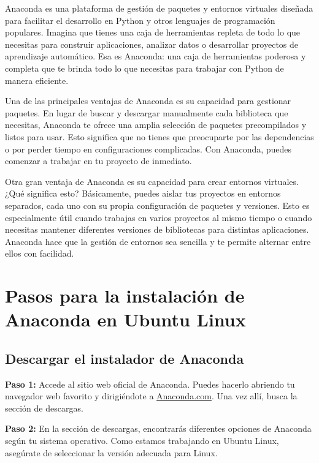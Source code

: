 \documentclass[
  letterpaper,
  DIV=11,
  numbers=noendperiod]{scrartcl}
\begin{document}
Anaconda es una plataforma de gestión de paquetes y entornos virtuales
diseñada para facilitar el desarrollo en Python y otros lenguajes de
programación populares. Imagina que tienes una caja de herramientas
repleta de todo lo que necesitas para construir aplicaciones, analizar
datos o desarrollar proyectos de aprendizaje automático. Esa es
Anaconda: una caja de herramientas poderosa y completa que te brinda
todo lo que necesitas para trabajar con Python de manera eficiente.

Una de las principales ventajas de Anaconda es su capacidad para
gestionar paquetes. En lugar de buscar y descargar manualmente cada
biblioteca que necesitas, Anaconda te ofrece una amplia selección de
paquetes precompilados y listos para usar. Esto significa que no tienes
que preocuparte por las dependencias o por perder tiempo en
configuraciones complicadas. Con Anaconda, puedes comenzar a trabajar en
tu proyecto de inmediato.

Otra gran ventaja de Anaconda es su capacidad para crear entornos
virtuales. ¿Qué significa esto? Básicamente, puedes aislar tus proyectos
en entornos separados, cada uno con su propia configuración de paquetes
y versiones. Esto es especialmente útil cuando trabajas en varios
proyectos al mismo tiempo o cuando necesitas mantener diferentes
versiones de bibliotecas para distintas aplicaciones. Anaconda hace que
la gestión de entornos sea sencilla y te permite alternar entre ellos
con facilidad.

\hypertarget{pasos-para-la-instalaciuxf3n-de-anaconda-en-ubuntu-linux}{%
\section{Pasos para la instalación de Anaconda en Ubuntu
Linux}\label{pasos-para-la-instalaciuxf3n-de-anaconda-en-ubuntu-linux}}

\hypertarget{descargar-el-instalador-de-anaconda}{%
\subsection{Descargar el instalador de
Anaconda}\label{descargar-el-instalador-de-anaconda}}

\textbf{Paso 1:} Accede al sitio web oficial de Anaconda. Puedes hacerlo
abriendo tu navegador web favorito y dirigiéndote a
\href{https://www.anaconda.com/}{Anaconda.com}. Una vez allí, busca la
sección de descargas.

\textbf{Paso 2:} En la sección de descargas, encontrarás diferentes
opciones de Anaconda según tu sistema operativo. Como estamos trabajando
en Ubuntu Linux, asegúrate de seleccionar la versión adecuada para
Linux.
\end{document}
